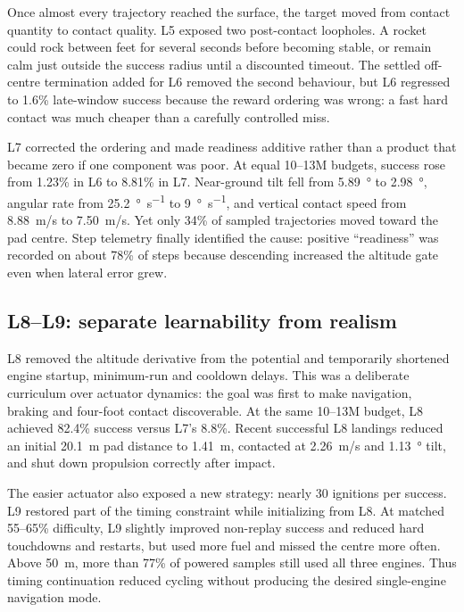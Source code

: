 Once almost every trajectory reached the surface, the target moved from contact quantity to
contact quality. L5 exposed two post-contact loopholes. A rocket could rock between feet for
several seconds before becoming stable, or remain calm just outside the success radius until a
discounted timeout. The settled off-centre termination added for L6 removed the second behaviour,
but L6 regressed to 1.6\% late-window success because the reward ordering was wrong: a fast hard
contact was much cheaper than a carefully controlled miss.

L7 corrected the ordering and made readiness additive rather than a product that became zero if
one component was poor. At equal 10--13M budgets, success rose from 1.23\% in L6 to 8.81\% in L7.
Near-ground tilt fell from \SI{5.89}{\degree} to \SI{2.98}{\degree}, angular rate from
\SI{25.2}{\degree\per\second} to \SI{9}{\degree\per\second}, and vertical contact speed from
\SI{8.88}{m/s} to \SI{7.50}{m/s}. Yet only 34\% of sampled trajectories moved toward the pad
centre. Step telemetry finally identified the cause: positive ``readiness'' was recorded on
about 78\% of steps because descending increased the altitude gate even when lateral error grew.

\subsection{L8--L9: separate learnability from realism}

L8 removed the altitude derivative from the potential and temporarily shortened engine startup,
minimum-run and cooldown delays. This was a deliberate curriculum over actuator dynamics: the
goal was first to make navigation, braking and four-foot contact discoverable. At the same
10--13M budget, L8 achieved 82.4\% success versus L7's 8.8\%. Recent successful L8 landings
reduced an initial \SI{20.1}{m} pad distance to \SI{1.41}{m}, contacted at \SI{2.26}{m/s} and
\SI{1.13}{\degree} tilt, and shut down propulsion correctly after impact.

The easier actuator also exposed a new strategy: nearly 30 ignitions per success. L9 restored
part of the timing constraint while initializing from L8. At matched 55--65\% difficulty, L9
slightly improved non-replay success and reduced hard touchdowns and restarts, but used more
fuel and missed the centre more often. Above \SI{50}{m}, more than 77\% of powered samples still
used all three engines. Thus timing continuation reduced cycling without producing the desired
single-engine navigation mode.

